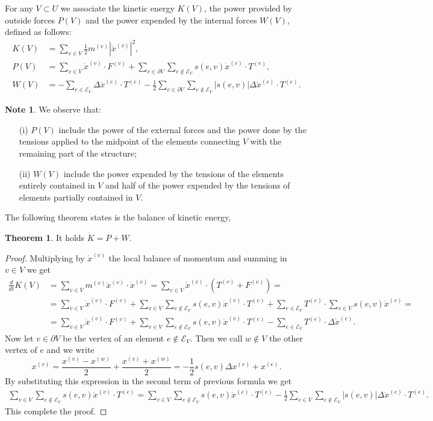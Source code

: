 \documentclass[a4paper,11pt]{article}
\theoremstyle{definition}
\newtheorem{theorem}[proposition]{Theorem}
\newtheorem*{note}{Note}
\begin{document}
For any $V\subset U$ we associate the kinetic energy $K(V)$, the power provided by outside forces $P(V)$ and the power expended by the internal forces $W(V)$, defined as follows:
\begin{align*}
K(V)&=\sum_{v\in V}\frac{1}{2}m^{(v)}|\dot{x}^{(v)}|^2,\\
P(V)&=\sum_{v\in V}\dot{x}^{(v)}\cdot F^{(v)}+\sum_{v\in\partial V}\sum_{e\notin\mathscr{E}_V}s(e,v)\dot{x}^{(e)}\cdot T^{(e)}, \\
W(V)&=-\sum_{e\in\mathscr{E}_V}\Delta \dot{x}^{(e)}\cdot T^{(e)}-\frac{1}{2}\sum_{v\in \partial V}\sum_{e\notin\mathscr{E}_V}|s(e,v)|\Delta \dot{x}^{(e)}\cdot T^{(e)}.
\end{align*}
\begin{note}
We observe that:
\begin{itemize}
\item[(i)] $P(V)$ include the power of the external forces and the power done by the tensions applied to the midpoint of the elements connecting $V$ with the remaining part of the structure;
\item[(ii)] $W(V)$ include the power expended by the tensions of the elements entirely contained in $V$ and half of the power expended by the tensions of elements partially contained in $V$.
\end{itemize}
\end{note}

The following theorem states is the balance of kinetic energy,
\begin{theorem}
It holds $\dot{K}=P+W$.
\end{theorem}
\begin{proof}
Multiplying by $\dot{x}^{(v)}$ the local balance of momentum and summing in $v\in V$ we get
\[
\begin{split}
\frac{d}{dt}K(V)&=\sum_{v\in V}m^{(v)}\ddot{x}^{(v)}\cdot\dot{x}^{(v)}=\sum_{v\in V}\dot{x}^{(v)}\cdot\left(T^{(v)}+F^{(v)}\right)=\\
&=\sum_{v\in V}\dot{x}^{(v)}\cdot F^{(v)}+\sum_{v\in V}\sum_{e\notin\mathscr{E}_V}s(e,v)\dot{x}^{(v)}\cdot T^{(e)}+\sum_{e\in\mathscr{E}_V}T^{(e)}\cdot\sum_{v\in V}s(e,v)\dot{x}^{(v)}=\\
&=\sum_{v\in V}\dot{x}^{(v)}\cdot F^{(v)}+\sum_{v\in V}\sum_{e\notin\mathscr{E}_V}s(e,v)\dot{x}^{(v)}\cdot T^{(e)}-\sum_{e\in\mathscr{E}_V}T^{(e)}\cdot\Delta\dot{x}^{(e)}.
\end{split}
\]
Now let $v\in\partial V$ be the vertex of an element $e\notin\mathscr{E}_V$. Then we call $w\notin V$ the other vertex of $e$ and we write
\[
x^{(v)}=\frac{x^{(v)}-x^{(w)}}{2}+\frac{x^{(v)}+x^{(w)}}{2}=-\frac{1}{2}s(e,v)\Delta x^{(e)}+x^{(e)}.
\]
By substituting this expression in the second term of previous formula we get
\[
\begin{split}
\sum_{v\in V}\sum_{e\notin\mathscr{E}_V}s(e,v)\dot{x}^{(v)}\cdot T^{(e)}=\sum_{v\in V}\sum_{e\notin\mathscr{E}_V}s(e,v)\dot{x}^{(e)}\cdot T^{(e)}-\frac{1}{2}\sum_{v\in V}\sum_{e\notin\mathscr{E}_V}|s(e,v)|\Delta \dot{x}^{(e)}\cdot T^{(e)}.
\end{split}
\]
This complete the proof.
\end{proof}
\end{document}
